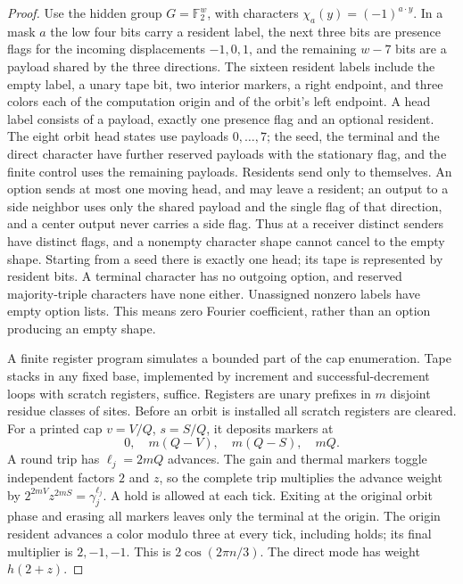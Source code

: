 \begin{proof}
Use the hidden group \(G=\mathbb F_2^w\), with characters \(\chi_a(y)=(-1)^{a\cdot y}\). In a mask \(a\) the low four bits carry a resident label, the next three bits are presence flags for the incoming displacements \(-1,0,1\), and the remaining \(w-7\) bits are a payload shared by the three directions. The sixteen resident labels include the empty label, a unary tape bit, two interior markers, a right endpoint, and three colors each of the computation origin and of the orbit's left endpoint. A head label consists of a payload, exactly one presence flag and an optional resident. The eight orbit head states use payloads \(0,\ldots,7\); the seed, the terminal and the direct character have further reserved payloads with the stationary flag, and the finite control uses the remaining payloads. Residents send only to themselves. An option sends at most one moving head, and may leave a resident; an output to a side neighbor uses only the shared payload and the single flag of that direction, and a center output never carries a side flag. Thus at a receiver distinct senders have distinct flags, and a nonempty character shape cannot cancel to the empty shape. Starting from a seed there is exactly one head; its tape is represented by resident bits. A terminal character has no outgoing option, and reserved majority-triple characters have none either. Unassigned nonzero labels have empty option lists. This means zero Fourier coefficient, rather than an option producing an empty shape.

A finite register program simulates a bounded part of the cap enumeration. Tape stacks in any fixed base, implemented by increment and successful-decrement loops with scratch registers, suffice. Registers are unary prefixes in \(m\) disjoint residue classes of sites. Before an orbit is installed all scratch registers are cleared. For a printed cap \(v=V/Q\), \(s=S/Q\), it deposits markers at
\[
 0,\quad m(Q-V),\quad m(Q-S),\quad mQ.
\]
A round trip has \(\ell_j=2mQ\) advances. The gain and thermal markers toggle independent factors \(2\) and \(z\), so the complete trip multiplies the advance weight by \(2^{2mV}z^{2mS}=\gamma_j^{\ell_j}\). A hold is allowed at each tick. Exiting at the original orbit phase and erasing all markers leaves only the terminal at the origin. The origin resident advances a color modulo three at every tick, including holds; its final multiplier is \(2,-1,-1\). This is \(2\cos(2\pi n/3)\). The direct mode has weight \(h(2+z)\).


\end{proof}

